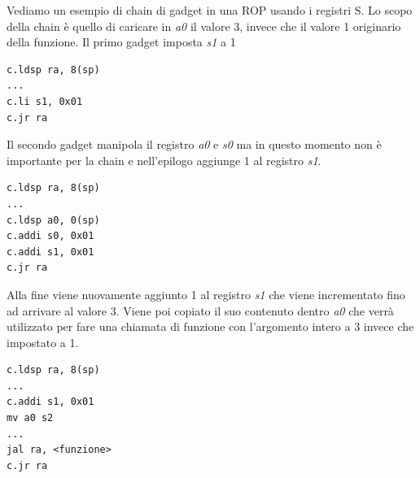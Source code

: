 Vediamo un esempio di chain di gadget in una ROP usando i registri S. Lo scopo della chain è quello di caricare in \textit{a0} il valore 3, invece che il valore 1 originario della funzione. Il primo gadget imposta \textit{s1} a 1 
\begin{verbatim}
c.ldsp ra, 8(sp)
...
c.li s1, 0x01
c.jr ra
\end{verbatim} 
Il secondo gadget manipola il registro \textit{a0} e \textit{s0} ma in questo momento non è importante per la chain e nell'epilogo aggiunge 1 al registro \textit{s1}.
\begin{verbatim}
c.ldsp ra, 8(sp)
...
c.ldsp a0, 0(sp)
c.addi s0, 0x01
c.addi s1, 0x01
c.jr ra
\end{verbatim} 
Alla fine viene nuovamente aggiunto 1 al registro \textit{s1} che viene incrementato fino ad arrivare al valore 3. Viene poi copiato il suo contenuto dentro \textit{a0} che verrà utilizzato per fare una chiamata di funzione con l'argomento intero a 3 invece che impostato a 1.
\begin{verbatim}
c.ldsp ra, 8(sp)
...
c.addi s1, 0x01
mv a0 s2
...
jal ra, <funzione>
c.jr ra
\end{verbatim} 

